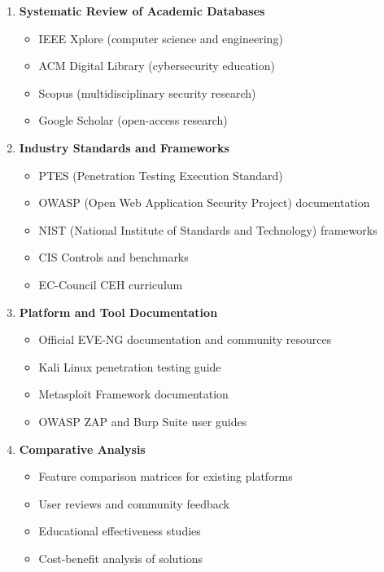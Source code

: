 \begin{enumerate}

\item \textbf{Systematic Review of Academic Databases}
\begin{itemize}
\item IEEE Xplore (computer science and engineering)
\item ACM Digital Library (cybersecurity education)
\item Scopus (multidisciplinary security research)
\item Google Scholar (open-access research)
\end{itemize}

\item \textbf{Industry Standards and Frameworks}
\begin{itemize}
\item PTES (Penetration Testing Execution Standard)
\item OWASP (Open Web Application Security Project) documentation
\item NIST (National Institute of Standards and Technology) frameworks
\item CIS Controls and benchmarks
\item EC-Council CEH curriculum
\end{itemize}

\item \textbf{Platform and Tool Documentation}
\begin{itemize}
\item Official EVE-NG documentation and community resources
\item Kali Linux penetration testing guide
\item Metasploit Framework documentation
\item OWASP ZAP and Burp Suite user guides
\end{itemize}

\item \textbf{Comparative Analysis}
\begin{itemize}
\item Feature comparison matrices for existing platforms
\item User reviews and community feedback
\item Educational effectiveness studies
\item Cost-benefit analysis of solutions
\end{itemize}

\end{enumerate}

